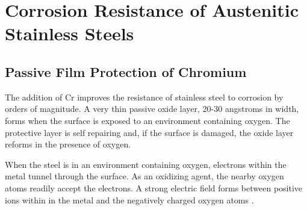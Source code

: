 \FloatBarrier





\FloatBarrier







\section[Corrosion Resistance]{Corrosion Resistance of Austenitic Stainless Steels}

\subsection{Passive Film Protection of Chromium}

The addition of Cr improves the resistance of stainless steel to corrosion by orders of magnitude.  A very thin passive oxide layer, 20-30 angstroms in width, forms when the surface is exposed to an environment containing oxygen.  The protective layer is self repairing and, if the surface is damaged, the oxide layer reforms in the presence of oxygen.

When the steel is in an environment containing oxygen, electrons within the metal tunnel through the surface.  As an oxidizing agent, the nearby oxygen atoms readily accept the electrons.  A strong electric field forms between positive ions within in the metal and the negatively charged oxygen atoms \cite{medicalmetals133}.  

